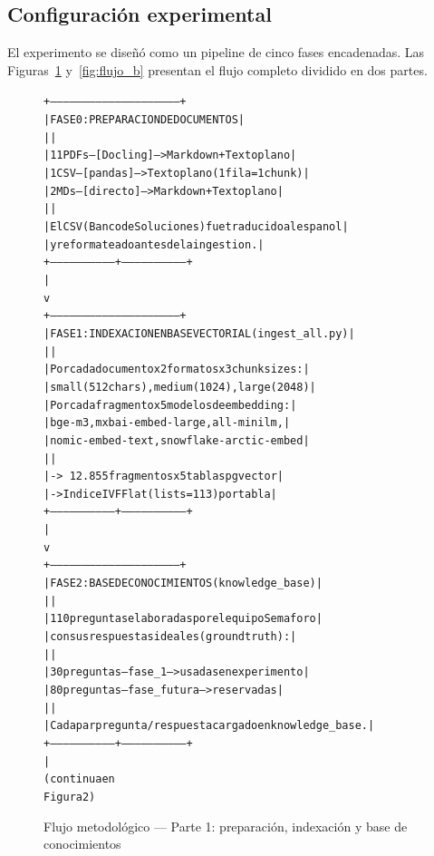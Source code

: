 \documentclass{article}
\begin{document}
\subsection{Configuración experimental}

El experimento se diseñó como un pipeline de cinco fases encadenadas.
Las Figuras~\ref{fig:flujo_a} y~\ref{fig:flujo_b} presentan el flujo
completo dividido en dos partes.

\begin{figure}[H]
\centering
\begin{alltt}\small
+------------------------------------------------------------+
| FASE 0: PREPARACION DE DOCUMENTOS                         |
|                                                           |
|  11 PDFs --[Docling]--> Markdown + Texto plano           |
|   1 CSV  --[pandas] --> Texto plano (1 fila = 1 chunk)   |
|   2 MDs  --[directo]--> Markdown + Texto plano           |
|                                                           |
|  El CSV (Banco de Soluciones) fue traducido al espanol   |
|  y reformateado antes de la ingestion.                   |
+-----------------------------+------------------------------+
                              |
                              v
+------------------------------------------------------------+
| FASE 1: INDEXACION EN BASE VECTORIAL (ingest_all.py)      |
|                                                           |
|  Por cada documento x 2 formatos x 3 chunk sizes:        |
|    small (512 chars), medium (1024), large (2048)         |
|  Por cada fragmento x 5 modelos de embedding:            |
|    bge-m3, mxbai-embed-large, all-minilm,                |
|    nomic-embed-text, snowflake-arctic-embed               |
|                                                           |
|  -> ~12.855 fragmentos x 5 tablas pgvector               |
|  -> Indice IVFFlat (lists=113) por tabla                 |
+-----------------------------+------------------------------+
                              |
                              v
+------------------------------------------------------------+
| FASE 2: BASE DE CONOCIMIENTOS (knowledge_base)            |
|                                                           |
|  110 preguntas elaboradas por el equipo Semaforo          |
|  con sus respuestas ideales (ground truth):               |
|                                                           |
|    30 preguntas -- fase_1     --> usadas en experimento  |
|    80 preguntas -- fase_futura --> reservadas            |
|                                                           |
|  Cada par pregunta/respuesta cargado en knowledge_base.  |
+-----------------------------+------------------------------+
                              |
                          (continua en
                          Figura 2)
\end{alltt}
\caption{Flujo metodológico — Parte 1: preparación, indexación y base de conocimientos}
\label{fig:flujo_a}
\end{figure}
\end{document}
